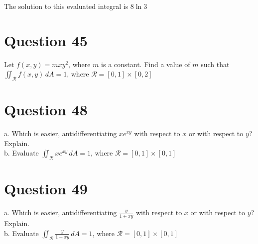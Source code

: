 \documentclass[hidelinks]{article}
\begin{document}
The solution to this evaluated integral is $8\ln 3$
\newpage
\section{Question 45}
Let $f(x, y) = mxy^2$, where $m$ is a constant. Find a value of $m$ such that $\iint_{\mathcal{R}} f(x, y) \, dA = 1$, where $\mathcal{R} = [0,1] \times [0,2]$


\newpage
\section{Question 48}
a. Which is easier, antidifferentiating $xe^{xy}$ with respect to $x$ or with respect to $y$? Explain.\\
b. Evaluate $\iint_{\mathcal{R}} xe^{xy} \, dA = 1$, where $\mathcal{R} = [0,1] \times [0,1]$
\newpage
\section{Question 49}
a. Which is easier, antidifferentiating $\frac{y}{1+xy}$ with respect to $x$ or with respect to $y$? Explain.\\
b. Evaluate $\iint_{\mathcal{R}} \frac{y}{1+xy} \, dA = 1$, where $\mathcal{R} = [0,1] \times [0,1]$
\end{document}
